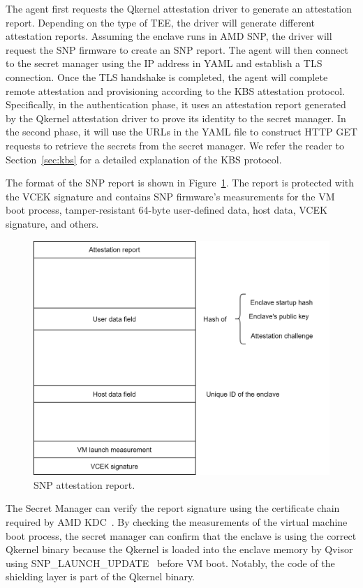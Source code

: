 The agent first requests the Qkernel attestation driver to generate an attestation report. Depending on the type of TEE, the driver will generate different attestation reports. Assuming the enclave runs in AMD SNP, the driver will request the SNP firmware to create an SNP report. The agent will then connect to the secret manager using the IP address in YAML and 
establish a TLS connection. Once the TLS handshake is completed, the agent will complete remote attestation and provisioning according to the KBS attestation protocol. Specifically, in the authentication phase, it uses an attestation report generated by the Qkernel attestation driver to prove its identity to the secret manager. In the second phase, it will use the URLs in 
the YAML file to construct HTTP GET requests to retrieve the secrets from the secret manager. We refer the reader to Section~\ref{sec:kbs} for a detailed explanation of the KBS protocol.

The format of the SNP report is shown in Figure~\ref*{fig:attestation_report_format}. The report is protected with the VCEK signature and contains SNP firmware's measurements for the VM boot process, tamper-resistant 64-byte user-defined data, host data, VCEK signature, and others.
\begin{figure}[!htb]
    \centering
    \includegraphics[height=0.3\textheight]{images/attestation_report_format.png}
    \caption[SNP attestation report]{SNP attestation report.}
    \label{fig:attestation_report_format}
\end{figure}
The Secret Manager can verify the report signature using the certificate chain required by AMD KDC~\cite*{snp_kdc}. By checking the measurements of the virtual machine boot process, the secret manager can confirm that the enclave is using the correct Qkernel binary because the Qkernel is loaded into the enclave memory by Qvisor using 
SNP\_LAUNCH\_UPDATE~\cite*{snp_firmware}
before VM boot. Notably, the code of the shielding layer is part of the Qkernel binary.

